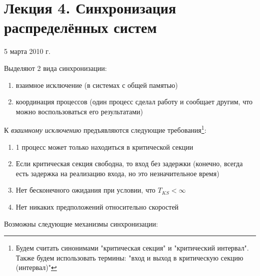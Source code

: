 \documentclass[a4paper,12pt]{article}
\begin{document}
	\section{\bf Лекция 4. Синхронизация распределённых систем}
	\centerline{5 марта 2010 г.}
	Выделяют 2 вида синхронизации:
	\begin{enumerate}
		\item взаимное исключение (в системах с общей памятью)
		\item координация процессов (один процесс сделал работу и сообщает другим, что можно
		воспользоваться его результатами)
	\end{enumerate}
	К {\em взаимному исключению} предъявляются следующие требования\footnote {Будем считать
	синонимами "критическая секция" и "критический интервал". Также будем использовать
	термины: "вход и выход в критическую секцию (интервал)"}:
	\begin{enumerate}
		\item 1 процесс может только находиться в критической секции
		\item Если критическая секция свободна, то вход без задержки (конечно, всегда есть
		задержка на реализацию входа, но это незначительное время)
		\item Нет бесконечного ожидания при условии, что $T_{KS}<\infty$
		\item Нет никаких предположений относительно скоростей
	\end{enumerate}
	Возможны следующие механизмы синхронизации:
\end{document}
